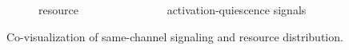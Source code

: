 \begin{figure}
\begin{columns}
\end{columns}%
\begin{columns}
\begin{column}{0.5\textwidth}
\begin{subfigure}[b]{\textwidth}
  \caption{resource}
\end{subfigure}
\end{column}
\begin{column}{0.5\textwidth}
\begin{subfigure}[b]{\textwidth}
\caption{activation-quiescence signals}
\end{subfigure}
\end{column}
\end{columns}
\caption{Co-visualization of same-channel signaling and resource distribution.}
\end{figure}
